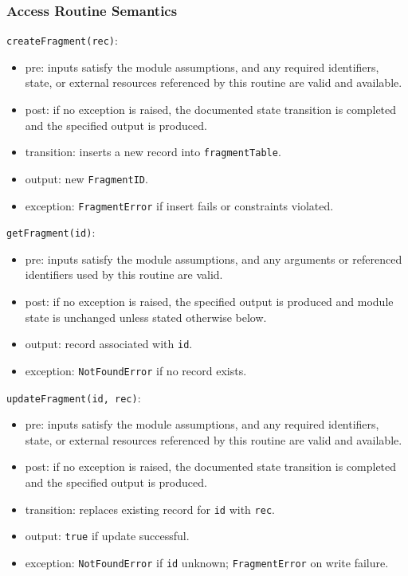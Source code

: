 \documentclass[12pt, titlepage]{article}
\begin{document}
\subsubsection{Access Routine Semantics}

\noindent \texttt{createFragment(rec)}:
\begin{itemize}
    \item pre: inputs satisfy the module assumptions, and any required identifiers, state, or external resources referenced by this routine are valid and available.
    \item post: if no exception is raised, the documented state transition is completed and the specified output is produced.
    \item transition: inserts a new record into \texttt{fragmentTable}.
    \item output: new \texttt{FragmentID}.
    \item exception: \texttt{FragmentError} if insert fails or constraints violated.
\end{itemize}

\noindent \texttt{getFragment(id)}:
\begin{itemize}
    \item pre: inputs satisfy the module assumptions, and any arguments or referenced identifiers used by this routine are valid.
    \item post: if no exception is raised, the specified output is produced and module state is unchanged unless stated otherwise below.
    \item output: record associated with \texttt{id}.
    \item exception: \texttt{NotFoundError} if no record exists.
\end{itemize}

\noindent \texttt{updateFragment(id, rec)}:
\begin{itemize}
    \item pre: inputs satisfy the module assumptions, and any required identifiers, state, or external resources referenced by this routine are valid and available.
    \item post: if no exception is raised, the documented state transition is completed and the specified output is produced.
    \item transition: replaces existing record for \texttt{id} with \texttt{rec}.
    \item output: \texttt{true} if update successful.
    \item exception: \texttt{NotFoundError} if \texttt{id} unknown; \texttt{FragmentError} on write failure.
\end{itemize}
\end{document}
